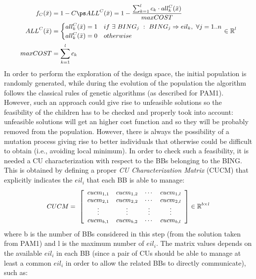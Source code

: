%
\begin{equation} \label{eq17_PAM2}
\small
\begin{aligned} 
f_{C}(\bar x) &= 1 - C \ps ALL^{C}(\bar x) = 1 - \frac{\sum^l_{k=1} c_{k} \cdot all^{C}_{k}(\bar x)}{maxCOST} \\
ALL^{C}(\bar x) &= \begin{cases} 
all^{C}_{k}(\bar x) = 1 & if \ \exists \ BING_{j} \ : \ BING_{j} \Rightarrow eil_{k}, \ \forall j=1..n\\ 
all^{C}_{k}(\bar x) = 0 & otherwise
\end{cases} \in \mathbb{R}^{l} \\
maxCOST &= \sum^l_{k=1} c_{k}
\end{aligned}
\end{equation}
%
%
In order to perform the exploration of the design space, the initial population is randomly generated, while during the evolution of the population the algorithm follows the classical rules of genetic algorithms (as described for PAM1). However, such an approach could give rise to unfeasible solutions so the feasibility of the children has to be checked and properly took into account: unfeasible solutions will get an higher cost function and so they will be probably removed from the population. However, there is always the possibility of a mutation process giving rise to better individuals that otherwise could be difficult to obtain (i.e., avoiding local minimum). In order to check such a feasibility, it is needed a CU characterization with respect to the BBs belonging to the BING. This is obtained by defining a proper \textit{CU Characterization Matrix} (CUCM) that explicitly indicates the $eil_i$ that each BB is able to manage:
%
\begin{equation} \label{eq8_PAM2IF}
\small
\begin{aligned}
CUCM=\ \left[  
\begin{array}{cccc}
{cucm}_{1,1} & {cucm}_{1,2} & \cdots  & {cucm}_{1,l} \\ 
{cucm}_{2,1} & {cucm}_{2,2} & \cdots  & {cucm}_{2,l} \\ 
\vdots      & \vdots      & \vdots  & \vdots  \\ 
{cucm}_{b,1} & {cucm}_{b,2} & \cdots  & {cucm}_{b,l} 
\end{array}
\right]  \in \mathbb{R}^{b \times l}  \\ 
\end{aligned}
\end{equation}
%
where b is the number of BBs considered in this step (from the solution taken from PAM1) and l is the maximum number of $eil_i$. The matrix values depends on the available $eil_i$ in each BB (since a pair of CUs should be able to manage at least a common $eil_i$ in order to allow the related BBs to directly communicate), such as:  
